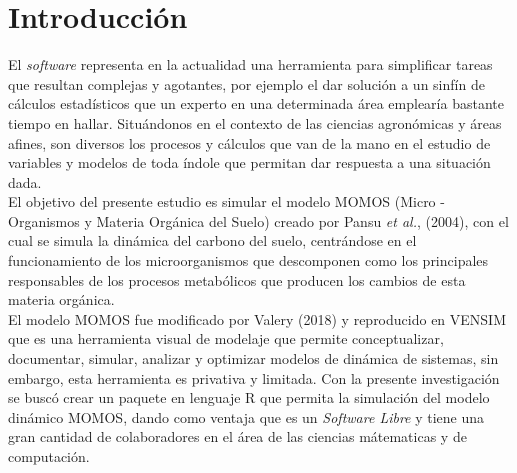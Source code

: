 \chapter*{Introducci\'on}


El \textit{software} representa en la actualidad una herramienta para simplificar tareas que resultan complejas
y agotantes, por ejemplo el dar soluci\'on a un sinf\'in de c\'alculos estad\'isticos que un experto en una determinada \'area
emplear\'ia bastante tiempo en hallar. Situ\'andonos en el contexto de las ciencias agron\'omicas y \'areas afines, son diversos los procesos y c\'alculos
que van de la mano en el estudio de variables y modelos de toda \'indole que permitan dar respuesta a una situaci\'on dada.\\

El objetivo del presente estudio es simular el modelo MOMOS (Micro - Organismos y Materia Orgánica del Suelo) creado por Pansu \textit{et al.}, (2004), con el cual se simula la din\'amica del carbono del suelo, centr\'andose en el funcionamiento de los microorganismos que descomponen como los principales responsables de los procesos metabólicos que producen los cambios de esta materia orgánica.\\

El modelo MOMOS fue modificado por Valery (2018) y reproducido en VENSIM que es una herramienta visual de modelaje que permite conceptualizar, documentar, simular, analizar y optimizar modelos de dinámica de sistemas, sin embargo, esta herramienta es privativa y limitada. Con la presente investigaci\'on se busc\'o crear un paquete en lenguaje R que permita la simulaci\'on del modelo din\'amico MOMOS, dando como ventaja que es un \textit{Software Libre} y tiene una gran cantidad de colaboradores en el \'area de las ciencias m\'atematicas y de computaci\'on.\\
